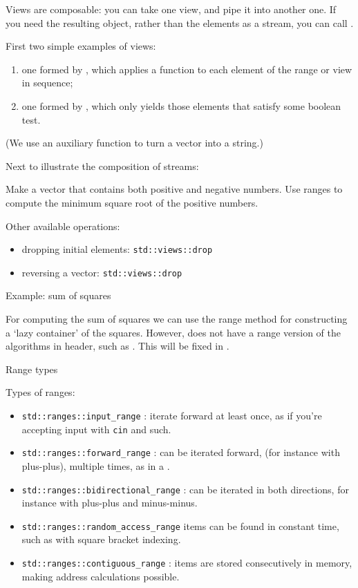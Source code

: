 Views are composable: you can take one view, and pipe it into another one.
If you need the resulting object, rather than the elements as a stream,
you can call .

First two simple examples of views:
\begin{enumerate}
\item
  one formed by , which applies
  a function to each element of the range or view in sequence;
\item one formed by , which only
  yields those elements that satisfy some boolean test.
\end{enumerate}
(We use an auxiliary function to turn a vector into a string.)


Next to illustrate the composition of streams:


\begin{exercise}
  Make a vector that contains both positive and negative numbers.
  Use ranges to compute the minimum square root of the positive numbers.
\end{exercise}

Other available operations:
\begin{itemize}
\item dropping initial elements: \lstinline+std::views::drop+
\item reversing a vector: \lstinline+std::views::drop+
\end{itemize}

 {Example: sum of squares}

For computing the sum of squares
we can use the range  method
for constructing a `lazy container' of the squares.
However,  does not have a range version
of the algorithms in  header,
such as . This will be fixed in .


 {Range types}

Types of ranges:
\begin{itemize}
\item \lstinline+std::ranges::input_range+ : iterate forward at least once,
  as if you're accepting input with \lstinline{cin} and such.
\item \lstinline+std::ranges::forward_range+ : can be iterated forward,
  (for instance with plus-plus), multiple times,
  as in a .
\item \lstinline+std::ranges::bidirectional_range+ : can be iterated in both
  directions, for instance with plus-plus and minus-minus.
\item \lstinline+std::ranges::random_access_range+ items can be found
  in constant time, such as with square bracket indexing.
\item \lstinline+std::ranges::contiguous_range+ : items
  are stored consecutively in memory, making address calculations possible.
\end{itemize}

